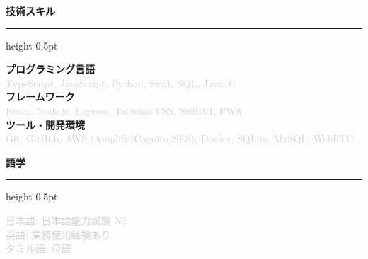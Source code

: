 \documentclass[9.5pt, a4paper]{article}
\newcommand{\leftsection}[1]{%
  \vspace{10pt}
  {\fontsize{10.5}{12.5}\selectfont\textcolor{leftaccent}{\textbf{#1}}}\par
  \vspace{3pt}
  {\color{lightgray}\hrule height 0.5pt}\par
  \vspace{6pt}
}
\begin{document}
{\begin{minipage}[t][0.96\textheight][t]{0.34\textwidth}
\begin{minipage}[t]{0.88\textwidth}
      \leftsection{技術スキル}
      {\fontsize{8.2}{11.5}\selectfont
      \textcolor{leftaccent}{\textbf{プログラミング言語}}\\
      \vspace{1pt}
      \textcolor{lightgray}{TypeScript, JavaScript, Python, Swift, SQL, Java, C}\\
      \vspace{4pt}
      \textcolor{leftaccent}{\textbf{フレームワーク}}\\
      \vspace{1pt}
      \textcolor{lightgray}{React, Node.js, Express, Tailwind CSS, SwiftUI, PWA}\\
      \vspace{4pt}
      \textcolor{leftaccent}{\textbf{ツール・開発環境}}\\
      \vspace{1pt}
      \textcolor{lightgray}{Git, GitHub, AWS (Amplify/Cognito/SES), Docker, SQLite, MySQL, WebRTC}
      }

      \leftsection{語学}
      {\fontsize{8.5}{12}\selectfont
      \textcolor{lightgray}{日本語: 日本語能力試験 N2\\
      \vspace{2pt}
      英語: 業務使用経験あり\\
      \vspace{2pt}
      タミル語: 母語}
      }
    \end{minipage}
  \end{minipage}%
}%
\hfill
\end{document}
